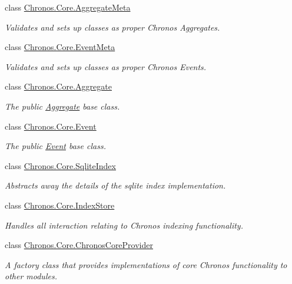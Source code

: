 \begin{DoxyCompactItemize}
class \hyperlink{classChronos_1_1Core_1_1AggregateMeta}{Chronos.\+Core.\+Aggregate\+Meta}
\begin{DoxyCompactList}\small\item\em Validates and sets up classes as proper Chronos Aggregates. \end{DoxyCompactList}\item 
class \hyperlink{classChronos_1_1Core_1_1EventMeta}{Chronos.\+Core.\+Event\+Meta}
\begin{DoxyCompactList}\small\item\em Validates and sets up classes as proper Chronos Events. \end{DoxyCompactList}\item 
class \hyperlink{classChronos_1_1Core_1_1Aggregate}{Chronos.\+Core.\+Aggregate}
\begin{DoxyCompactList}\small\item\em The public \hyperlink{classChronos_1_1Core_1_1Aggregate}{Aggregate} base class. \end{DoxyCompactList}\item 
class \hyperlink{classChronos_1_1Core_1_1Event}{Chronos.\+Core.\+Event}
\begin{DoxyCompactList}\small\item\em The public \hyperlink{classChronos_1_1Core_1_1Event}{Event} base class. \end{DoxyCompactList}\item 
class \hyperlink{classChronos_1_1Core_1_1SqliteIndex}{Chronos.\+Core.\+Sqlite\+Index}
\begin{DoxyCompactList}\small\item\em Abstracts away the details of the sqlite index implementation. \end{DoxyCompactList}\item 
class \hyperlink{classChronos_1_1Core_1_1IndexStore}{Chronos.\+Core.\+Index\+Store}
\begin{DoxyCompactList}\small\item\em Handles all interaction relating to Chronos indexing functionality. \end{DoxyCompactList}\item 
class \hyperlink{classChronos_1_1Core_1_1ChronosCoreProvider}{Chronos.\+Core.\+Chronos\+Core\+Provider}
\begin{DoxyCompactList}\small\item\em A factory class that provides implementations of core Chronos functionality to other modules. \end{DoxyCompactList}\item 

\end{DoxyCompactItemize}
